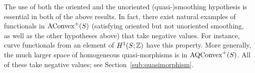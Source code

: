 \begin{remark}
The use of both the oriented and the unoriented (quasi-)smoothing hypothesis
is essential in both of the above results. In fact, there exist
natural examples of functionals in $\mathrm{AConvex}^+(S)$ (satisfying
oriented but not unoriented smoothing, as well as the other
hypotheses above) that take negative values. For instance, curve
functionals from an element of $H^1(S; \mathbb{Z})$ have this property. More
generally, the much larger space of
homogeneous quasi-morphisms is in $\mathrm{AQConvex}^+(S)$. All of these take negative
values; see
Section~\ref{sub:quasimorphism}.
\end{remark}




